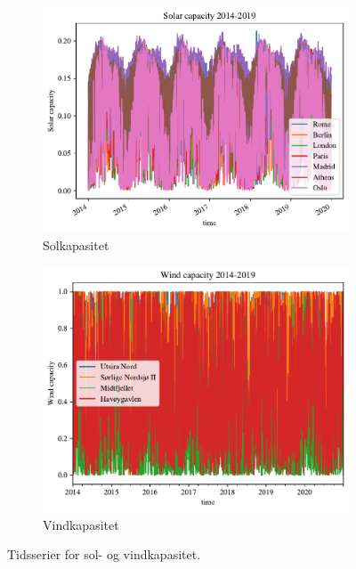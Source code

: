 \documentclass{article}
\begin{document}
\begin{figure}[ht]
\centering
\begin{subfigure}{.5\textwidth}
    \centering
    \includegraphics[width=\linewidth]{oblig/figures/Solar/Solar capacity 2014-2019.pdf}
    \caption{Solkapasitet}
    \label{fig:ren_sol}
\end{subfigure}%
\begin{subfigure}{.5\textwidth}
    \centering
    \includegraphics[width=\linewidth]{oblig/figures/Wind/Wind capacity 2014-2019.pdf}
    \caption{Vindkapasitet}
    \label{fig:ren_vind}
\end{subfigure}
\caption{Tidsserier for sol- og vindkapasitet.}
\label{fig:rene_tidserier}
\end{figure}
\end{document}
